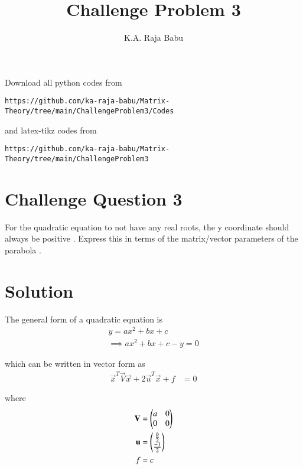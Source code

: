 \documentclass[journal,12pt,twocolumn]{IEEEtran}
\begin{document}
     \def\rightbox#1{\makebox[0in][r]{#1}}
     \def\centbox#1{\makebox[0in]{#1}}
     \def\topbox#1{\raisebox{-\baselineskip}[0in][0in]{#1}}
     \def\midbox#1{\raisebox{-0.5\baselineskip}[0in][0in]{#1}}
\vspace{3cm}
\title{Challenge Problem 3}
\author{K.A. Raja Babu}
\maketitle
\newpage
\bigskip
\renewcommand{\thefigure}{\theenumi}
\renewcommand{\thetable}{\theenumi}
Download all python codes from 
\begin{lstlisting}
https://github.com/ka-raja-babu/Matrix-Theory/tree/main/ChallengeProblem3/Codes
\end{lstlisting}
%
and latex-tikz codes from 
%
\begin{lstlisting}
https://github.com/ka-raja-babu/Matrix-Theory/tree/main/ChallengeProblem3
\end{lstlisting}
%
\section{Challenge Question 3}

For the quadratic equation to not have any real roots, the y coordinate should always be positive . Express this in terms of the matrix/vector parameters of the parabola .

\section{Solution}

The general form of a quadratic equation is 
\begin{align}
    y = ax^2+bx+c \\
    \implies ax^2+bx+c-y = 0
\end{align}

which can be written in vector form as
\begin{align}
    \vec{x}^T\vec{V}\vec{x} + 2\vec{u}^T\vec{x} + f &= 0
\end{align}

where
\begin{align}
    \mathbf{V} &= \begin{pmatrix}a & 0 \\ 0 & 0\end{pmatrix}
    \\
    \mathbf{u} &= \begin{pmatrix}\frac{b}{2} \\ \frac{-1}{2}\end{pmatrix}
    \\
    f &= c
\end{align}
\end{document}
